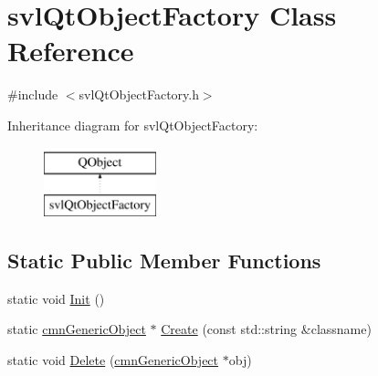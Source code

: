 \hypertarget{classsvl_qt_object_factory}{\section{svl\-Qt\-Object\-Factory Class Reference}
\label{classsvl_qt_object_factory}
}


{\ttfamily \#include $<$svl\-Qt\-Object\-Factory.\-h$>$}

Inheritance diagram for svl\-Qt\-Object\-Factory\-:\begin{figure}[H]
\begin{center}
\leavevmode
\includegraphics[height=2.000000cm]{d4/d88/classsvl_qt_object_factory}
\end{center}
\end{figure}
\subsection*{Static Public Member Functions}
\begin{DoxyCompactItemize}
\item 
static void \hyperlink{classsvl_qt_object_factory_afabcc9b0e574b2b1954260de26e35027}{Init} ()
\item 
static \hyperlink{classcmn_generic_object}{cmn\-Generic\-Object} $\ast$ \hyperlink{classsvl_qt_object_factory_a1b7567ed8e958af3e8f26c7e029995f5}{Create} (const std\-::string \&classname)
\item 
static void \hyperlink{classsvl_qt_object_factory_a336a6499d29a43babe3f151f9ad94836}{Delete} (\hyperlink{classcmn_generic_object}{cmn\-Generic\-Object} $\ast$obj)
\end{DoxyCompactItemize}


